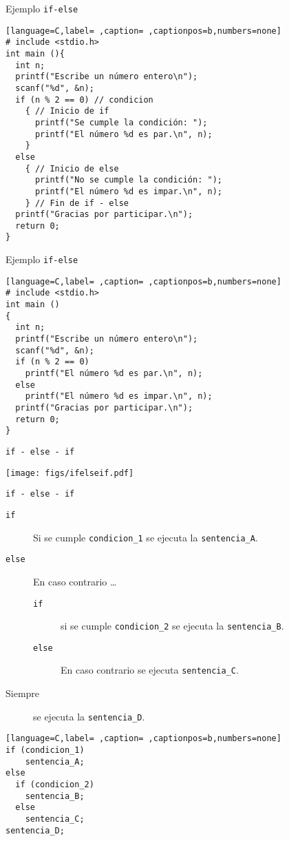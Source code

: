 \documentclass[usenames,svgnames,dvipsnames, aspectratio=169]{beamer}
\begin{document}
\begin{frame}[label={sec:org7581f8a},fragile,plain]{Ejemplo \texttt{if-else}}
 \begin{lstlisting}[language=C,label= ,caption= ,captionpos=b,numbers=none]
# include <stdio.h>
int main (){
  int n;
  printf("Escribe un número entero\n");
  scanf("%d", &n);
  if (n % 2 == 0) // condicion
    { // Inicio de if 
      printf("Se cumple la condición: ");
      printf("El número %d es par.\n", n);      
    }
  else
    { // Inicio de else
      printf("No se cumple la condición: ");
      printf("El número %d es impar.\n", n);      
    } // Fin de if - else
  printf("Gracias por participar.\n");
  return 0;
}
\end{lstlisting}
\end{frame}

\begin{frame}[label={sec:orgb49c50c},fragile]{Ejemplo \texttt{if-else}}
 \begin{lstlisting}[language=C,label= ,caption= ,captionpos=b,numbers=none]
# include <stdio.h>
int main ()
{
  int n;
  printf("Escribe un número entero\n");
  scanf("%d", &n);
  if (n % 2 == 0)
    printf("El número %d es par.\n", n);
  else
    printf("El número %d es impar.\n", n);
  printf("Gracias por participar.\n");
  return 0;
}
\end{lstlisting}
\end{frame}


\begin{frame}[label={sec:org3948b31},fragile]{\texttt{if - else - if}}
 \begin{center}
\texttt{[image: figs/ifelseif.pdf]}
\end{center}
\end{frame}
\begin{frame}[label={sec:org4c9ea69},fragile]{\texttt{if - else - if}}
 \begin{description}
\item[{\texttt{if}}] Si se cumple \texttt{condicion\_1} se ejecuta la \texttt{sentencia\_A}.
\item[{\texttt{else}}] En caso contrario \ldots{}
\begin{description}
\item[{\texttt{if}}] si se cumple \texttt{condicion\_2} se ejecuta la \texttt{sentencia\_B}.
\item[{\texttt{else}}] En caso contrario se ejecuta \texttt{sentencia\_C}.
\end{description}
\item[{Siempre}] se ejecuta la \texttt{sentencia\_D}.
\end{description}
\begin{lstlisting}[language=C,label= ,caption= ,captionpos=b,numbers=none]
if (condicion_1)
    sentencia_A;
else
  if (condicion_2)
    sentencia_B;
  else
    sentencia_C;
sentencia_D;
\end{lstlisting}
\end{frame}
\end{document}
